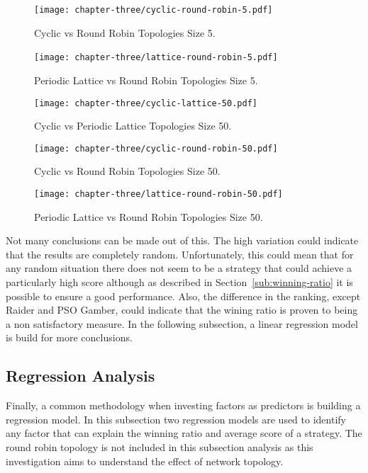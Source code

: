 \begin{figure}[H]
	\centering
	\texttt{[image: chapter-three/cyclic-round-robin-5.pdf]}\
	\caption{Cyclic vs Round Robin Topologies Size 5.}
	\label{fig:score-rankings-five-c-r}
\end{figure}

\begin{figure}[H]
	\centering
	\texttt{[image: chapter-three/lattice-round-robin-5.pdf]}\
	\caption{Periodic Lattice vs Round
	Robin Topologies Size 5.}
	\label{fig:score-rankings-five-l-r}
\end{figure}

\begin{figure}[H]
	\centering
	\texttt{[image: chapter-three/cyclic-lattice-50.pdf]}
	\caption{Cyclic vs Periodic Lattice Topologies Size 50.}
	\label{fig:score-rankings-fifty-c-l}
\end{figure}

\begin{figure}[H]
	\centering
	\texttt{[image: chapter-three/cyclic-round-robin-50.pdf]}
	\caption{Cyclic vs Round Robin Topologies Size 50.}
	\label{fig:score-rankings-fifty-c-r}
\end{figure}

\begin{figure}[H]
	\centering
	\texttt{[image: chapter-three/lattice-round-robin-50.pdf]}
	\caption{Periodic Lattice vs Round Robin Topologies Size 50.}
	\label{fig:score-rankings-fifty-l-r}
\end{figure}

Not many conclusions can be made out of this. The high variation could indicate
that the results are completely random. Unfortunately, this could mean that for
any random situation there does not seem to be a strategy that could
achieve a particularly high score although as described in Section~\ref{sub:winning-ratio}
it is possible to ensure a good performance. Also, the difference in the ranking,
except Raider and PSO Gamber, could indicate that the wining ratio is proven
to being a non satisfactory measure. In the following subsection, a linear
regression model is build for more conclusions.


\subsection{Regression Analysis}
\label{sub:regression}
Finally, a common methodology when investing factors as predictors is building a
regression model. In this subsection two regression models are used to identify
any
factor that can explain the winning ratio and average score of a strategy.
The round robin topology is not included in this subsection analysis as this
investigation aims to understand the effect of network topology.

